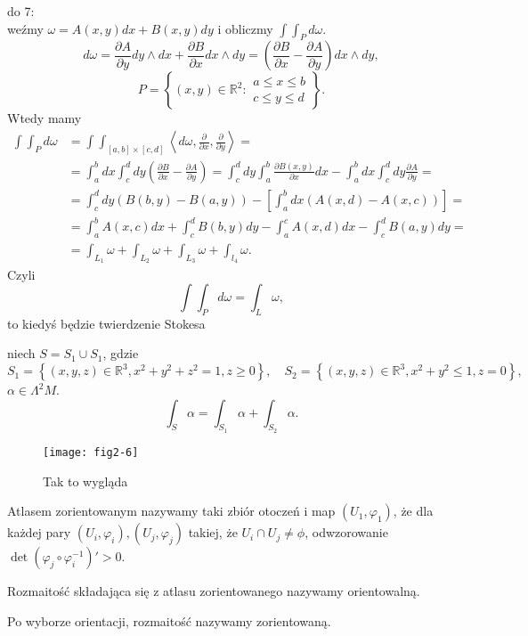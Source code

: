 \documentclass[../main.tex]{subfiles}
\begin{document}
\begin{przyklad}
    do 7:\\
    weźmy $\omega = A(x,y)dx + B(x,y)dy$ i obliczmy $\int\int_P d\omega$.
     \[
         d\omega = \frac{\partial A}{\partial y} dy\land dx + \frac{\partial B}{\partial x} dx\land dy = \left(\frac{\partial B}{\partial x} - \frac{\partial A}{\partial y} \right)dx\land dy
    ,\]
\[
    P = \left\{ (x,y)\in \mathbb{R}^2: \begin{matrix}a\le x\le b\\ c\le y \le d \end{matrix} \right\}
.\]
Wtedy mamy
\begin{align*}
    \int\int_P d\omega &= \int\int_{[a,b]\times[c,d]} \left<d\omega, \frac{\partial }{\partial x} , \frac{\partial }{\partial y}  \right> = \\
    &= \int_a^b dx \int_c^d dy\left(\frac{\partial B}{\partial x} - \frac{\partial A}{\partial y} \right) = \int_c^d dy\int_a^b \frac{\partial B(x,y)}{\partial x} dx - \int_a^bdx\int_c^ddy \frac{\partial A}{\partial y} = \\
    &= \int_c^d dy(B(b,y) - B(a,y)) - \left[ \int_a^bdx \left( A(x,d) - A(x,c) \right)  \right] = \\
    &= \int_a^bA(x,c)dx + \int_c^dB(b,y)dy - \int_a^cA(x,d)dx - \int_c^dB(a,y)dy =\\
    &= \int_{L_1}\omega + \int_{L_2}\omega + \int_{L_3}\omega + \int_{l_4}\omega
.\end{align*}
Czyli \[
\int\int_Pd\omega = \int_L \omega
,\]
to kiedyś będzie twierdzenie Stokesa
\end{przyklad}
\begin{przyklad}
    niech $S = S_1\cup S_1$, gdzie
    \[
        S_1 = \left\{ (x,y,z)\in \mathbb{R}^3, x^2 + y^2 + z^2 = 1, z\ge 0 \right\},\quad S_2 = \left\{ (x,y,z)\in \mathbb{R}^3, x^2+y^2 \le 1, z = 0 \right\}
    ,\]
$\alpha\in \Lambda^2M$.
\[
\int_S \alpha = \int_{S_1}\alpha + \int_{S_2}\alpha
.\]
    \begin{figure}[h]
        \centering
        \texttt{[image: fig2-6]}
        \caption{Tak to wygląda}
        \label{fig:fig2-6}
    \end{figure}
\end{przyklad}
\begin{definicja}
    Atlasem zorientowanym nazywamy taki zbiór otoczeń i map $(U_1, \varphi_1)$, że dla każdej pary $(U_i, \varphi_i), (U_j, \varphi_j)$ takiej, że $U_i\cap U_j \neq \phi$, odwzorowanie $\det\left( \varphi_j \circ \varphi_i^{-1} \right)' > 0$.
\end{definicja}
\begin{definicja}
    Rozmaitość składająca się z atlasu zorientowanego nazywamy orientowalną.
\end{definicja}
\begin{definicja}
    Po wyborze orientacji, rozmaitość nazywamy zorientowaną.
\end{definicja}
\end{document}

